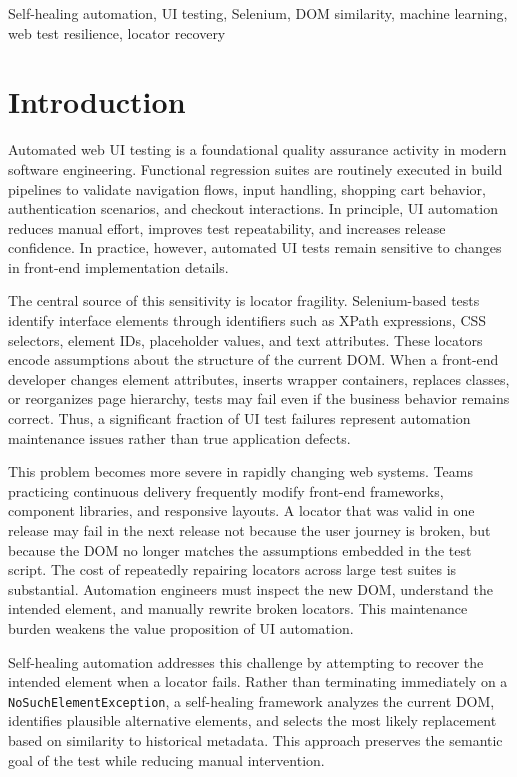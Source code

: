 \documentclass[conference]{IEEEtran}
\begin{document}
\begin{IEEEkeywords}
Self-healing automation, UI testing, Selenium, DOM similarity, machine learning, web test resilience, locator recovery
\end{IEEEkeywords}

\section{Introduction}
Automated web UI testing is a foundational quality assurance activity in modern software engineering. Functional regression suites are routinely executed in build pipelines to validate navigation flows, input handling, shopping cart behavior, authentication scenarios, and checkout interactions. In principle, UI automation reduces manual effort, improves test repeatability, and increases release confidence. In practice, however, automated UI tests remain sensitive to changes in front-end implementation details.

The central source of this sensitivity is locator fragility. Selenium-based tests identify interface elements through identifiers such as XPath expressions, CSS selectors, element IDs, placeholder values, and text attributes. These locators encode assumptions about the structure of the current DOM. When a front-end developer changes element attributes, inserts wrapper containers, replaces classes, or reorganizes page hierarchy, tests may fail even if the business behavior remains correct. Thus, a significant fraction of UI test failures represent automation maintenance issues rather than true application defects.

This problem becomes more severe in rapidly changing web systems. Teams practicing continuous delivery frequently modify front-end frameworks, component libraries, and responsive layouts. A locator that was valid in one release may fail in the next release not because the user journey is broken, but because the DOM no longer matches the assumptions embedded in the test script. The cost of repeatedly repairing locators across large test suites is substantial. Automation engineers must inspect the new DOM, understand the intended element, and manually rewrite broken locators. This maintenance burden weakens the value proposition of UI automation.

Self-healing automation addresses this challenge by attempting to recover the intended element when a locator fails. Rather than terminating immediately on a \texttt{NoSuchElementException}, a self-healing framework analyzes the current DOM, identifies plausible alternative elements, and selects the most likely replacement based on similarity to historical metadata. This approach preserves the semantic goal of the test while reducing manual intervention.
\end{document}
